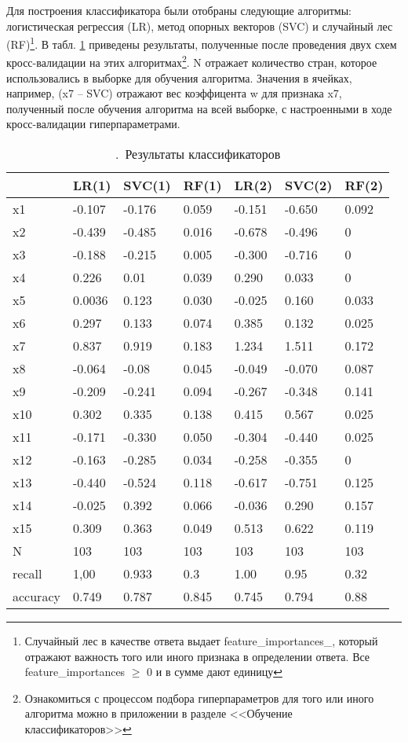 \documentclass[a4paper, 12pt]{article}
\theoremstyle{plain} %
\theoremstyle{definition} %
\theoremstyle{remark} %
\begin{document}
Для построения классификатора были отобраны следующие алгоритмы: логистическая регрессия (LR), метод опорных векторов (SVC) и случайный лес (RF)\footnote{Случайный лес в качестве ответа выдает feature\_importances\_, который отражают важность того или иного признака в определении ответа. Все feature\_importances $\geqslant$ 0 и в сумме дают единицу}. В табл. \ref{classifiers} приведены результаты, полученные после проведения двух схем кросс-валидации на этих алгоритмах\footnote{Ознакомиться с процессом подбора гиперпараметров для того или иного алгоритма можно в приложении в разделе <<Обучение классификаторов>>}. N отражает количество стран, которое использовались в выборке для обучения алгоритма. Значения в ячейках, например, (x7 – SVC) отражают вес коэффицента w для признака x7, полученный после обучения алгоритма на всей выборке, с настроенными в ходе кросс-валидации гиперпараметрами.
\begin{table}[]
	\centering
	\caption{.\, Результаты классификаторов}
	\label{classifiers}
	\begin{tabular}{|l|l|l|l|l|l|l|}
		\hline
		& LR(1)  & SVC(1) & RF(1) & LR(2)  & SVC(2) & RF(2) \\ \hline
		x1       & -0.107 & -0.176 & 0.059 & -0.151 & -0.650 & 0.092 \\ \hline
		x2       & -0.439 & -0.485 & 0.016 & -0.678 & -0.496 & 0     \\ \hline
		x3       & -0.188 & -0.215 & 0.005 & -0.300 & -0.716 & 0     \\ \hline
		x4       & 0.226  & 0.01   & 0.039 & 0.290  & 0.033  & 0     \\ \hline
		x5       & 0.0036 & 0.123  & 0.030 & -0.025 & 0.160  & 0.033 \\ \hline
		x6       & 0.297  & 0.133  & 0.074 & 0.385  & 0.132  & 0.025 \\ \hline
		x7       & 0.837  & 0.919  & 0.183 & 1.234  & 1.511  & 0.172 \\ \hline
		x8       & -0.064 & -0.08  & 0.045 & -0.049 & -0.070 & 0.087 \\ \hline
		x9       & -0.209 & -0.241 & 0.094 & -0.267 & -0.348 & 0.141 \\ \hline
		x10      & 0.302  & 0.335  & 0.138 & 0.415  & 0.567  & 0.025 \\ \hline
		x11      & -0.171 & -0.330 & 0.050 & -0.304 & -0.440 & 0.025 \\ \hline
		x12      & -0.163 & -0.285 & 0.034 & -0.258 & -0.355 & 0     \\ \hline
		x13      & -0.440 & -0.524 & 0.118 & -0.617 & -0.751 & 0.125 \\ \hline
		x14      & -0.025 & 0.392  & 0.066 & -0.036 & 0.290  & 0.157 \\ \hline
		x15      & 0.309  & 0.363  & 0.049 & 0.513  & 0.622  & 0.119 \\ \hline
		N        & 103    & 103    & 103   & 103    & 103    & 103   \\ \hline
		recall   & 1,00   & 0.933  & 0.3   & 1.00   & 0.95   & 0.32  \\ \hline
		accuracy & 0.749  & 0.787  & 0.845 & 0.745  & 0.794  & 0.88  \\ \hline
	\end{tabular}
\end{table}
\end{document}
